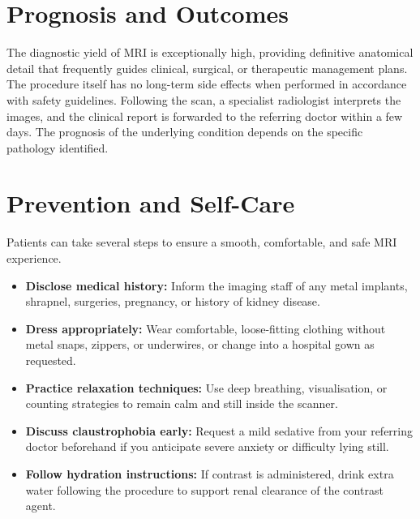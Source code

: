 \section*{Prognosis and Outcomes}
The diagnostic yield of MRI is exceptionally high, providing definitive anatomical detail that frequently guides clinical, surgical, or therapeutic management plans. The procedure itself has no long-term side effects when performed in accordance with safety guidelines. Following the scan, a specialist radiologist interprets the images, and the clinical report is forwarded to the referring doctor within a few days. The prognosis of the underlying condition depends on the specific pathology identified.

\section*{Prevention and Self-Care}
Patients can take several steps to ensure a smooth, comfortable, and safe MRI experience.
\begin{itemize}
    \item \textbf{Disclose medical history:} Inform the imaging staff of any metal implants, shrapnel, surgeries, pregnancy, or history of kidney disease.
    \item \textbf{Dress appropriately:} Wear comfortable, loose-fitting clothing without metal snaps, zippers, or underwires, or change into a hospital gown as requested.
    \item \textbf{Practice relaxation techniques:} Use deep breathing, visualisation, or counting strategies to remain calm and still inside the scanner.
    \item \textbf{Discuss claustrophobia early:} Request a mild sedative from your referring doctor beforehand if you anticipate severe anxiety or difficulty lying still.
    \item \textbf{Follow hydration instructions:} If contrast is administered, drink extra water following the procedure to support renal clearance of the contrast agent.
\end{itemize}

